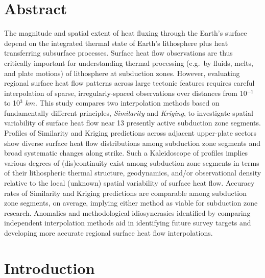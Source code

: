 
\hypertarget{chpt3Abstract}{%
\section{Abstract}\label{chpt3Abstract}}

The magnitude and spatial extent of heat fluxing through the Earth's surface depend on the integrated thermal state of Earth's lithosphere plus heat transferring subsurface processes. Surface heat flow observations are thus critically important for understanding thermal processing (e.g.~by fluids, melts, and plate motions) of lithosphere at subduction zones. However, evaluating regional surface heat flow patterns across large tectonic features requires careful interpolation of sparse, irregularly-spaced observations over distances from 10\(^{-1}\) to 10\(^3\) \(km\). This study compares two interpolation methods based on fundamentally different principles, \emph{Similarity} and \emph{Kriging}, to investigate spatial variability of surface heat flow near 13 presently active subduction zone segments. Profiles of Similarity and Kriging predictions across adjacent upper-plate sectors show diverse surface heat flow distributions among subduction zone segments and broad systematic changes along strike. Such a Kaleidoscope of profiles implies various degrees of (dis)continuity exist among subduction zone segments in terms of their lithospheric thermal structure, geodynamics, and/or observational density relative to the local (unknown) spatial variability of surface heat flow. Accuracy rates of Similarity and Kriging predictions are comparable among subduction zone segments, on average, implying either method as viable for subduction zone research. Anomalies and methodological idiosyncrasies identified by comparing independent interpolation methods aid in identifying future survey targets and developing more accurate regional surface heat flow interpolations.

\hypertarget{chpt3Intro}{%
\section{Introduction}\label{chpt3Intro}}

